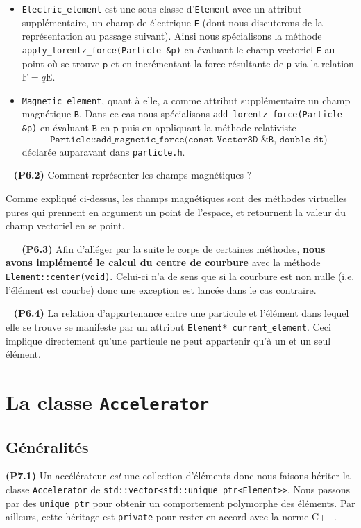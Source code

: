 \documentclass[12pt, letterpaper, twoside]{article}
\newcommand{\T}[1]{\texttt{#1}}
\begin{document}
\begin{itemize}
\item \T{Electric\_element} est une sous-classe d'\T{Element} avec un attribut supplémentaire, un champ de électrique \T{E} (dont nous discuterons de la représentation au passage suivant). Ainsi nous spécialisons la méthode \T{apply\_lorentz\_force(Particle \&p)} en évaluant le champ vectoriel \T{E} au point où se trouve $\T{p}$ et en incrémentant la force résultante de \T{p} via la relation $\boldsymbol{\mathrm{F}}=q\boldsymbol{\mathrm{E}}$.

\item \T{Magnetic\_element}, quant à elle, a comme attribut supplémentaire un champ magnétique \T{B}. Dans ce cas nous spécialisons \T{add\_lorentz\_force(Particle \&p)} en évaluant $\T{B}$ en $\T{p}$ puis en appliquant la méthode relativiste $$\T{Particle::add\_magnetic\_force(const Vector3D \&B, double dt)}$$ déclarée auparavant dans \T{particle.h}.

\end{itemize}

\ \linebreak
\textbf{(P6.2)} Comment représenter les champs magnétiques ?

Comme expliqué ci-dessus, les champs magnétiques sont des méthodes virtuelles pures qui prennent en argument un point de l'espace, et retournent la valeur du champ vectoriel en se point.

\ \linebreak
\ \linebreak
\textbf{(P6.3)} Afin d'alléger par la suite le corps de certaines méthodes, \textbf{nous avons implémenté le calcul du centre de courbure} avec la méthode \T{Element::center(void)}. Celui-ci n'a de sens que si la courbure est non nulle (i.e. l'élément est courbe) donc une exception est lancée dans le cas contraire.

\ \linebreak
\textbf{(P6.4)} La relation d'appartenance entre une particule et l'élément dans lequel elle se trouve se manifeste par un attribut \T{Element* current\_element}. Ceci implique directement qu'une particule ne peut appartenir qu'à un et un seul élément.

\section{La classe \T{Accelerator}}

\subsection{Généralités}
\noindent \textbf{(P7.1)} Un accélérateur \textit{est} une collection d'éléments donc nous faisons hériter la classe \T{Accelerator} de \T{std::vector<std::unique\_ptr<Element>>}. Nous passons par des \T{unique\_ptr} pour obtenir un comportement polymorphe des éléments. Par ailleurs, cette héritage est \T{private} pour rester en accord avec la norme C++.
\end{document}
